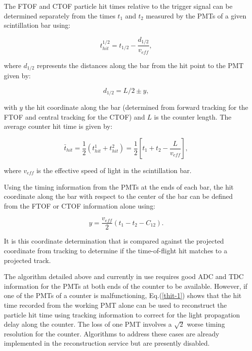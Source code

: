 The FTOF and CTOF particle hit times relative to the trigger signal can be determined separately from the times
$t_1$ and $t_2$ measured by the PMTs of a given scintillation bar using:

\begin{equation}
\label{thit-1}
t_{hit}^{1/2} = t_{1/2} - \frac{d_{1/2}}{v_{eff}},
\end{equation}

\noindent
where $d_{1/2}$ represents the distances along the bar from the hit point to the PMT given by:

\begin{equation}
d_{1/2}= L/2 \pm y,
\end{equation}

\noindent
with $y$ the hit coordinate along the bar (determined from forward tracking for the FTOF and central tracking
for the CTOF) and $L$ is the counter length. The average counter hit time is given by:

\begin{equation}
\label{thit-2}
\bar{t}_{hit} = \frac{1}{2} ( t_{hit}^1 + t_{hit}^2 ) = \frac{1}{2} \left[ t_1 + t_2 - \frac{L}{v_{eff}} \right],
\end{equation}

\noindent
where $v_{eff}$ is the effective speed of light in the scintillation bar.

Using the timing information from the PMTs at the ends of each bar, the hit coordinate along the bar with respect
to the center of the bar can be defined from the FTOF or CTOF information alone using:

\begin{equation}
\label{tof-coor}
y = \frac{v_{eff}}{2} (t_1 - t_2 - C_{12}).
\end{equation}

\noindent
It is this coordinate determination that is compared against the projected coordinate from tracking to determine
if the time-of-flight hit matches to a projected track.

The algorithm detailed above and currently in use requires good ADC and TDC information for the PMTs at both
ends of the counter to be available. However, if one of the PMTs of a counter is malfunctioning, Eq.(\ref{thit-1})
shows that the hit time recorded from the working PMT alone can be used to reconstruct the particle hit time using
tracking information to correct for the light propagation delay along the counter. The loss of one PMT involves a
$\sqrt{2}$ worse timing resolution for the counter. Algorithms to address these cases are already implemented in
the reconstruction service but are presently disabled.

